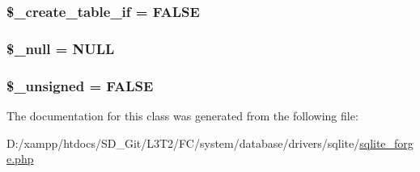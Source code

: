 \subsubsection[{\$\+\_\+create\+\_\+table\+\_\+if}]{\setlength{\rightskip}{0pt plus 5cm}\$\+\_\+create\+\_\+table\+\_\+if = F\+A\+L\+S\+E\hspace{0.3cm}{\ttfamily [protected]}}\label{class_c_i___d_b__sqlite__forge_a2f6484fcb8d1dc3eef67a637227cd583}
\hypertarget{class_c_i___d_b__sqlite__forge_ae58fe6a5104d4a069a49b27533ce808f}{}
\subsubsection[{\$\+\_\+null}]{\setlength{\rightskip}{0pt plus 5cm}\$\+\_\+null = \textquotesingle{}N\+U\+L\+L\textquotesingle{}\hspace{0.3cm}{\ttfamily [protected]}}\label{class_c_i___d_b__sqlite__forge_ae58fe6a5104d4a069a49b27533ce808f}
\hypertarget{class_c_i___d_b__sqlite__forge_aae977ae6d61fa183f0b25422b6ddc31c}{}
\subsubsection[{\$\+\_\+unsigned}]{\setlength{\rightskip}{0pt plus 5cm}\$\+\_\+unsigned = F\+A\+L\+S\+E\hspace{0.3cm}{\ttfamily [protected]}}\label{class_c_i___d_b__sqlite__forge_aae977ae6d61fa183f0b25422b6ddc31c}


The documentation for this class was generated from the following file\+:\begin{DoxyCompactItemize}
\item 
D\+:/xampp/htdocs/\+S\+D\+\_\+\+Git/\+L3\+T2/\+F\+C/system/database/drivers/sqlite/\hyperlink{sqlite__forge_8php}{sqlite\+\_\+forge.\+php}\end{DoxyCompactItemize}

